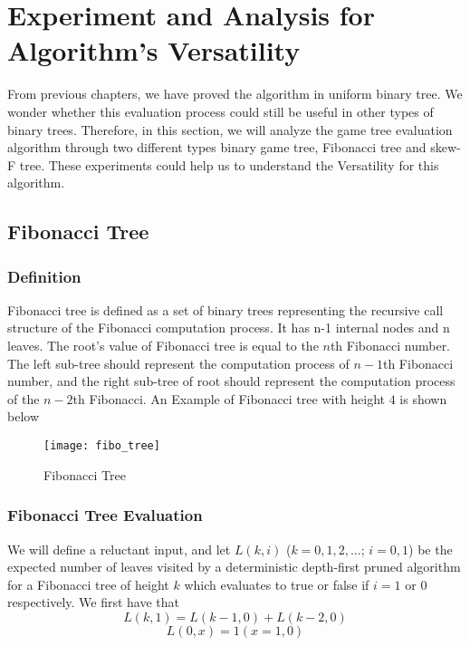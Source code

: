 \chapter{Experiment and Analysis for Algorithm's Versatility}
From previous chapters, we have proved the algorithm in uniform binary tree. We wonder whether this evaluation process could still be useful in other types of binary trees. Therefore, in this section, we will analyze the game tree evaluation algorithm through two different types binary game tree, Fibonacci tree and skew-F tree. These experiments could help us to understand the Versatility for this algorithm.
\section{Fibonacci Tree}
\subsection{Definition}
Fibonacci tree\cite{FIBONACCI1982} is defined as a set of binary trees representing the recursive call structure of the Fibonacci computation process. It has n-1 internal nodes and n leaves. 
The root's value of Fibonacci tree is equal to the $n$th Fibonacci number. The left sub-tree should represent the computation process of $n-1$th
Fibonacci number, and the right sub-tree of root should represent the computation process of the $n-2$th Fibonacci. An Example of Fibonacci tree with height $4$ is shown below
     
\begin{figure}[H]
	\centering
	\texttt{[image: fibo\_tree]}
	\caption{Fibonacci Tree}
	\label{fig:fibotree}
\end{figure}

\subsection{Fibonacci Tree Evaluation}
We will define a reluctant input, and let
$L(k, i)$ ($k = 0,1, 2, \dots$; $i = 0 ,1$) be 
the expected number of leaves visited by a deterministic
depth-first pruned algorithm for a Fibonacci tree of height $k$ which evaluates to true or false if $i = 1$ or $0$ respectively.
We first have that 
\begin{equation}
\label{eq:L1Fibonacci}
L(k, 1) = L(k-1, 0) + L(k-2, 0)
\end{equation}
\begin{equation}
L(0,x)=1(x=1,0)
\end{equation}


